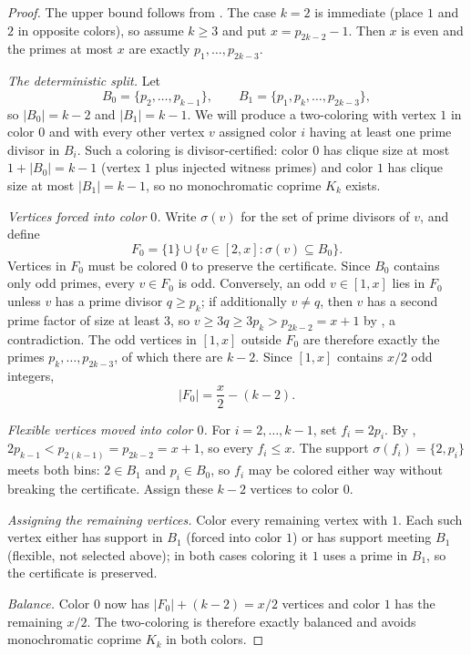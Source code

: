 \documentclass[11pt]{article}
\theoremstyle{plain}
\theoremstyle{definition}
\theoremstyle{remark}
\begin{document}
\begin{proof}
The upper bound follows from .  The case $k=2$ is immediate
(place $1$ and $2$ in opposite colors), so assume $k\ge3$ and put
$x=p_{2k-2}-1$.  Then $x$ is even and the primes at most $x$ are exactly
$p_1,\ldots,p_{2k-3}$.

\medskip\noindent\textit{The deterministic split.}
Let
\[
  B_0=\{p_2,\ldots,p_{k-1}\},\qquad
  B_1=\{p_1,p_k,\ldots,p_{2k-3}\},
\]
so $|B_0|=k-2$ and $|B_1|=k-1$.  We will produce a two-coloring with vertex
$1$ in color $0$ and with every other vertex $v$ assigned color $i$ having
at least one prime divisor in $B_i$.  Such a coloring is divisor-certified:
color $0$ has clique size at most $1+|B_0|=k-1$ (vertex $1$ plus injected
witness primes) and color $1$ has clique size at most $|B_1|=k-1$, so no
monochromatic coprime $K_k$ exists.

\medskip\noindent\textit{Vertices forced into color $0$.}
Write $\sigma(v)$ for the set of prime divisors of $v$, and define
\[
  F_0=\{1\}\cup\{v\in[2,x]:\sigma(v)\subseteq B_0\}.
\]
Vertices in $F_0$ must be colored $0$ to preserve the certificate.  Since
$B_0$ contains only odd primes, every $v\in F_0$ is odd.  Conversely, an odd
$v\in[1,x]$ lies in $F_0$ unless $v$ has a prime divisor $q\ge p_k$; if
additionally $v\ne q$, then $v$ has a second prime factor of size at least
$3$, so $v\ge 3q\ge 3p_k>p_{2k-2}=x+1$ by , a
contradiction.  The odd vertices in $[1,x]$ outside $F_0$ are therefore
exactly the primes $p_k,\ldots,p_{2k-3}$, of which there are $k-2$.  Since
$[1,x]$ contains $x/2$ odd integers,
\[
  |F_0|=\frac{x}{2}-(k-2).
\]

\medskip\noindent\textit{Flexible vertices moved into color $0$.}
For $i=2,\ldots,k-1$, set $f_i=2p_i$.  By ,
$2p_{k-1}<p_{2(k-1)}=p_{2k-2}=x+1$, so every $f_i\le x$.  The support
$\sigma(f_i)=\{2,p_i\}$ meets both bins: $2\in B_1$ and $p_i\in B_0$, so
$f_i$ may be colored either way without breaking the certificate.  Assign
these $k-2$ vertices to color $0$.

\medskip\noindent\textit{Assigning the remaining vertices.}
Color every remaining vertex with $1$.  Each such vertex either has support
in $B_1$ (forced into color $1$) or has support meeting $B_1$ (flexible,
not selected above); in both cases coloring it $1$ uses a prime in $B_1$,
so the certificate is preserved.

\medskip\noindent\textit{Balance.}
Color $0$ now has $|F_0|+(k-2)=x/2$ vertices and color $1$ has the remaining
$x/2$.  The two-coloring is therefore exactly balanced and avoids
monochromatic coprime $K_k$ in both colors.
\end{proof}
\end{document}
